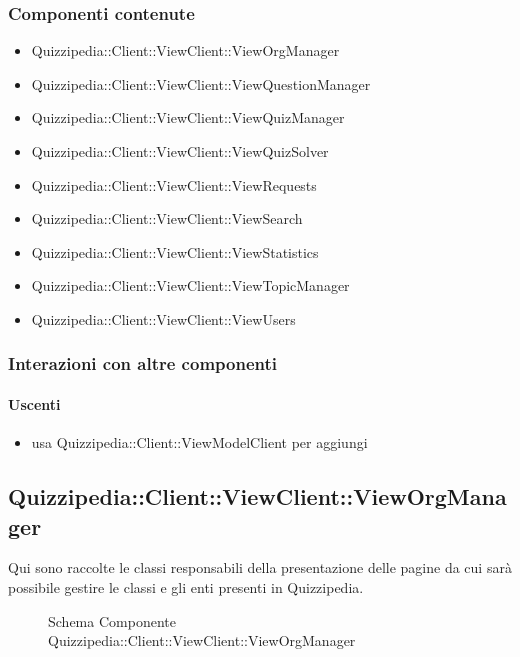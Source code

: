\subsubsection{Componenti contenute}
\begin{itemize}
\item Quizzipedia::Client::ViewClient::ViewOrgManager
\item Quizzipedia::Client::ViewClient::ViewQuestionManager
\item Quizzipedia::Client::ViewClient::ViewQuizManager
\item Quizzipedia::Client::ViewClient::ViewQuizSolver
\item Quizzipedia::Client::ViewClient::ViewRequests
\item Quizzipedia::Client::ViewClient::ViewSearch
\item Quizzipedia::Client::ViewClient::ViewStatistics
\item Quizzipedia::Client::ViewClient::ViewTopicManager
\item Quizzipedia::Client::ViewClient::ViewUsers
\end{itemize}
\subsubsection{Interazioni con altre componenti}
\paragraph{Uscenti}
\begin{itemize}
\item usa Quizzipedia::Client::ViewModelClient per aggiungi
\end{itemize}
\subsection{Quizzipedia::Client::ViewClient::ViewOrgManager}
Qui sono raccolte le classi responsabili della presentazione delle pagine da cui sarà possibile gestire le classi e gli enti presenti in Quizzipedia.
\begin{figure}[H]
\centering
\noindent{}
\caption[Schema Componente Quizzipedia::Client::ViewClient::ViewOrgManager]{Schema Componente Quizzipedia::Client::ViewClient::ViewOrgManager}
\end{figure}
